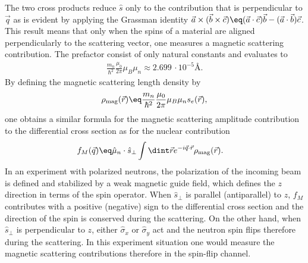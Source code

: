 \documentclass[\main/dresen_thesis.tex]{subfiles}
\begin{document}
The two cross products reduce $\hat{s}$ only to the contribution that is perpendicular to $\vec{q}$ as is evident by applying the Grassman identity $\vec{a} \times (\vec{b} \times \vec{c}) \eq (\vec{a} \cdot \vec{c}) \vec{b} - (\vec{a} \cdot \vec{b}) \vec{c}$.
This result means that only when the spins of a material are aligned perpendicularly to the scattering vector, one measures a magnetic scattering contribution.
The prefactor consist of only natural constants and evaluates to
\begin{align}
  \frac{m_n}{\hbar^2}  \frac{\mu_0}{2\pi} \mu_B \mu_n \approx 2.699\,\cdot 10^{-5} \unit{\angstrom}.
\end{align}
By defining the magnetic scattering length density by
\begin{align}
  \rho_\mathrm{mag} (\vec{r}) \eq \frac{m_n}{\hbar^2}  \frac{\mu_0}{2\pi} \mu_B \mu_n s_e (\vec{r}),
\end{align}
one obtains a similar formula for the magnetic scattering amplitude contribution to the differential cross section as for the nuclear contribution
\begin{align}
  f_M (\vec{q}) \eq & \hat{\mu}_n \cdot \hat{s}_\perp \int \dint \vec{r} e^{- i \vec{q} \cdot \vec{r}} \rho_\mathrm{mag}(\vec{r}).
\end{align}
In an experiment with polarized neutrons, the polarization of the incoming beam is defined and stabilized by a weak magnetic guide field, which defines the $z$ direction in terms of the spin operator.
When $\hat{s}_\perp$ is parallel (antiparallel) to $z$, $f_M$ contributes with a positive (negative) sign to the differential cross section and the direction of the spin is conserved during the scattering.
On the other hand, when $\hat{s}_\perp$ is perpendicular to $z$, either $\hat{\sigma}_x$ or $\hat{\sigma}_y$ act and the neutron spin flips therefore during the scattering.
In this experiment situation one would measure the magnetic scattering contributions therefore in the spin-flip channel.
\end{document}
